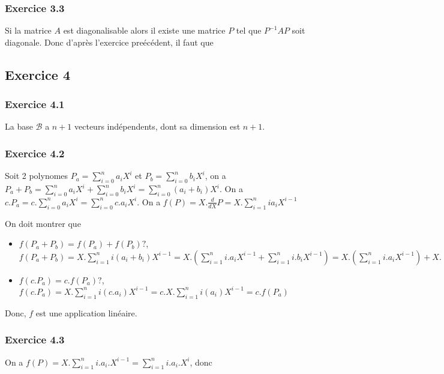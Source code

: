 \documentclass[]{book}
\theoremstyle{definition}
\begin{document}
\subsubsection*{Exercice 3.3}
Si la matrice $A$ est diagonalisable alors il existe une matrice $P$ tel que $P^{-1}AP$ soit diagonale. Donc d'apr\`es l'exercice pre\'ec\'edent, il faut que 


\subsection*{Exercice 4}
\subsubsection*{Exercice 4.1}
La base $\mathscr{B}$ a $n+1$ vecteurs ind\'ependents, dont sa dimension est $n+1$.

\subsubsection*{Exercice 4.2}
Soit 2 polynomes $P_a = \sum_{i=0}^{n}{a_iX^i}$ et $P_b= \sum_{i=0}^{n}{b_iX^i}$, on a $P_a+P_b = \sum_{i=0}^{n}{a_iX^i} + \sum_{i=0}^{n}{b_iX^i} = \sum_{i=0}^{n}{(a_i+b_i)X^i}$. On a $c.P_a = c.\sum_{i=0}^{n}{a_iX^i} = \sum_{i=0}^{n}{c.a_iX^i}$. On a $f(P) = X.\frac{d}{dX}P = X.\sum_{i=1}^{n}{ia_iX^{i-1}}$

On doit montrer que  
\begin{itemize}
\item $f(P_a+P_b)=f(P_a)+f(P_b)?$, $f(P_a+P_b) = X.\sum_{i=1}^{n}{i(a_i+b_i)X^{i-1}} = X.(\sum_{i=1}^{n}{i.a_iX^{i-1}} + \sum_{i=1}^{n}{i.b_iX^{i-1}}) = X.(\sum_{i=1}^{n}{i.a_iX^{i-1}}) + X.(\sum_{i=1}^{n}{i.b_iX^{i-1}}) = f(P_a)+f(P_b)$
\item $f(c.P_a) = c.f(P_a)?$, $f(c.P_a) = X.\sum_{i=1}^{n}{i(c.a_i)X^{i-1}} = c.X.\sum_{i=1}^{n}{i(a_i)X^{i-1}} = c.f(P_a)$
\end{itemize}
Donc, $f$ est une application lin\'eaire.

\subsubsection*{Exercice 4.3}
On a $f(P) = X.\sum_{i=1}^{n}{i.a_i.X^{i-1}} = \sum_{i=1}^{n}{i.a_i.X^{i}}$, donc
\end{document}
